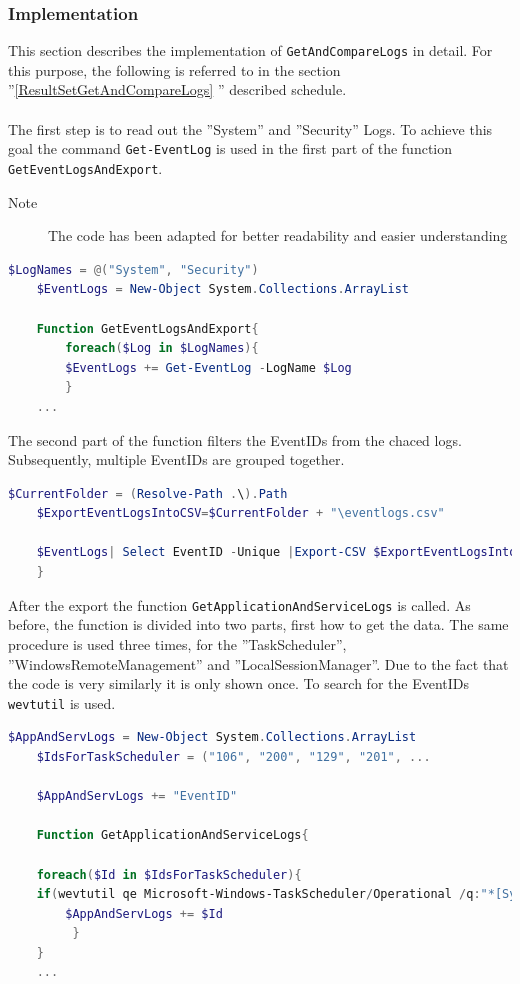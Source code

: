 \subsubsection{Implementation}
This section describes the implementation of \lstinline|GetAndCompareLogs| in detail. For this purpose, the following is referred to in the section ''\ref{ResultSetGetAndCompareLogs} '' described schedule.
\\\\
The first step is to read out the ''System'' and ''Security'' Logs. To achieve this goal the command \lstinline|Get-EventLog| is used in the first part of the function \lstinline|GetEventLogsAndExport|. \begin{description}
    \item[Note] The code has been adapted for better readability and easier understanding
    \end{description}
\begin{lstlisting}[caption=Function GetEventLogsAndExport Part 1, language=PowerShell]
    $LogNames = @("System", "Security")
    $EventLogs = New-Object System.Collections.ArrayList

    Function GetEventLogsAndExport{
        foreach($Log in $LogNames){
        $EventLogs += Get-EventLog -LogName $Log
        }
    ...
\end{lstlisting}
The second part of the function filters the EventIDs from the chaced logs. Subsequently, multiple EventIDs are grouped together.
\begin{lstlisting}[caption=Function GetEventLogsAndExport Part 2, language=PowerShell]
    $CurrentFolder = (Resolve-Path .\).Path
    $ExportEventLogsIntoCSV=$CurrentFolder + "\eventlogs.csv"

    $EventLogs| Select EventID -Unique |Export-CSV $ExportEventLogsIntoCSV -NoTypeInfo -Encoding UTF8
    }
\end{lstlisting}
After the export the function \lstinline|GetApplicationAndServiceLogs| is called. As before, the function is divided into two parts, first how to get the data. The same procedure is used three times, for the ''TaskScheduler'', ''WindowsRemoteManagement'' and ''LocalSessionManager''. Due to the fact that the code is very similarly it is only shown once. To search for the EventIDs  \lstinline|wevtutil| is used.
\begin{lstlisting}[caption=Function GetApplicationAndServiceLogs Part 1, language=PowerShell]
    $AppAndServLogs = New-Object System.Collections.ArrayList
    $IdsForTaskScheduler = ("106", "200", "129", "201", ...

    $AppAndServLogs += "EventID"

    Function GetApplicationAndServiceLogs{
    
    foreach($Id in $IdsForTaskScheduler){
    if(wevtutil qe Microsoft-Windows-TaskScheduler/Operational /q:"*[System[(EventID="$Id" )]]" /uni:false /f:text){
        $AppAndServLogs += $Id
         }
    }
    ...
\end{lstlisting}
